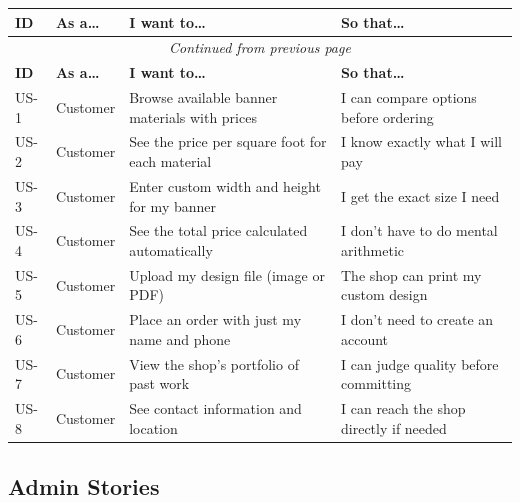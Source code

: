 \documentclass[12pt, a4paper]{article}
\begin{document}
\begin{longtable}{p{1cm} p{2.5cm} p{4.5cm} p{4cm}}
\toprule
\textbf{ID} & \textbf{As a\ldots} & \textbf{I want to\ldots} & \textbf{So that\ldots} \\
\midrule
\endfirsthead
\multicolumn{4}{c}{\textit{Continued from previous page}}\\
\toprule
\textbf{ID} & \textbf{As a\ldots} & \textbf{I want to\ldots} & \textbf{So that\ldots} \\
\midrule
\endhead
\bottomrule
\endlastfoot
US-1 & Customer & Browse available banner materials with prices & I can compare options before ordering \\
US-2 & Customer & See the price per square foot for each material & I know exactly what I will pay \\
US-3 & Customer & Enter custom width and height for my banner & I get the exact size I need \\
US-4 & Customer & See the total price calculated automatically & I don't have to do mental arithmetic \\
US-5 & Customer & Upload my design file (image or PDF) & The shop can print my custom design \\
US-6 & Customer & Place an order with just my name and phone & I don't need to create an account \\
US-7 & Customer & View the shop's portfolio of past work & I can judge quality before committing \\
US-8 & Customer & See contact information and location & I can reach the shop directly if needed \\
\end{longtable}

\subsection{Admin Stories}
\end{document}
